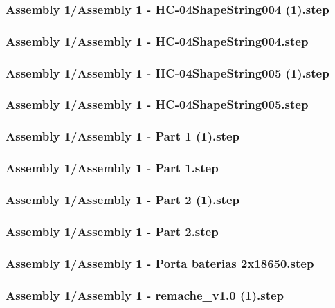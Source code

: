 \documentclass[a4paper,12pt]{article}
\begin{document}
\subsubsection{Assembly 1/Assembly 1 - HC-04ShapeString004 (1).step}

\subsubsection{Assembly 1/Assembly 1 - HC-04ShapeString004.step}

\subsubsection{Assembly 1/Assembly 1 - HC-04ShapeString005 (1).step}

\subsubsection{Assembly 1/Assembly 1 - HC-04ShapeString005.step}

\subsubsection{Assembly 1/Assembly 1 - Part 1 (1).step}

\subsubsection{Assembly 1/Assembly 1 - Part 1.step}

\subsubsection{Assembly 1/Assembly 1 - Part 2 (1).step}

\subsubsection{Assembly 1/Assembly 1 - Part 2.step}

\subsubsection{Assembly 1/Assembly 1 - Porta baterias 2x18650.step}

\subsubsection{Assembly 1/Assembly 1 - remache_v1.0 (1).step}

\end{document}
